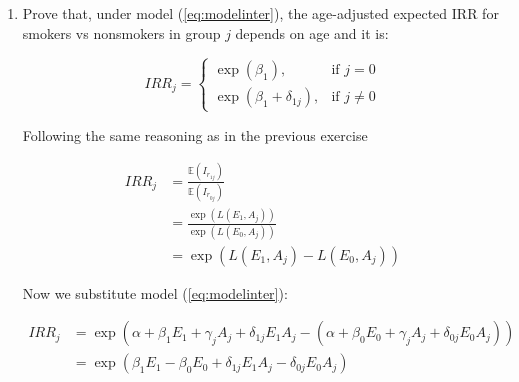 \documentclass[a4paper,10pt]{article}\usepackage[]{graphicx}\usepackage[]{xcolor}
\begin{document}
\begin{enumerate}
We can observe that the age group term $A_j$ cancels out, implying that the age-adjusted IRR does not depend on age.
Furthermore, since $E_1=1$ for smokers and $E_0=0$ for nonsmokers, we obtain

  \begin{equation*}
    IRR_{j} = \exp(\beta_{1})
  \end{equation*}
  
Thus, proving (\ref{eq:eq3}) and that the age-adjusted expected IRR for smokers vs nonsmokers in group j does not depend on age.



  \item Prove that, under model (\ref{eq:modelinter}), the age-adjusted expected IRR for smokers vs nonsmokers in group \(j\) depends on age and it is:
  
  \begin{equation}
  \label{eq:eq4}
  IRR_{j}=\begin{cases}
  \exp(\beta_{1}), & \text{if } j=0 \\
  \exp(\beta_{1}+\delta_{1j}), & \text{if } j\ne 0
  \end{cases}
  \end{equation}
  
Following the same reasoning as in the previous exercise

\begin{equation*}
  \begin{aligned}
    IRR_{j} &= \frac{ \mathbb{E}(I_{r_{1j}}) }
                    { \mathbb{E}(I_{r_{0j}}) } \\ 
            &= \frac{ \exp(L(E_{1},A_{j})) }
                    { \exp(L(E_{0},A_{j})) } \\ 
            &= \exp(L(E_{1},A_{j}) - L(E_{0},A_{j}))
  \end{aligned}
  \end{equation*}

Now we substitute model (\ref{eq:modelinter}):

  \begin{equation*}
  \begin{aligned}
    IRR_{j} &= \exp(\alpha+\beta_{1}E_{1}+\gamma_{j}A_{j}+\delta_{1j}E_{1}A_{j} - 
               (\alpha+\beta_{0}E_{0}+\gamma_{j}A_{j}+\delta_{0j}E_{0}A_{j})) \\ 
            &= \exp(\beta_{1}E_{1} - \beta_{0}E_{0} + \delta_{1j}E_{1}A_{j} - \delta_{0j}E_{0}A_{j})
  \end{aligned}
  \end{equation*}


\end{enumerate}
\end{document}
